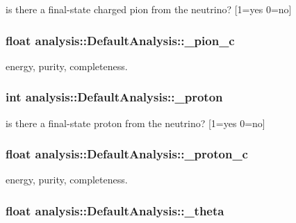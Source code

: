 is there a final-\/state charged pion from the neutrino? \mbox{[}1=yes 0=no\mbox{]} \hypertarget{classanalysis_1_1DefaultAnalysis_a9978effbcfba62536fc88a73fa985fe9}{
\subsubsection[{\-\_\-pion\-\_\-c}]{\setlength{\rightskip}{0pt plus 5cm}float analysis\-::\-Default\-Analysis\-::\-\_\-pion\-\_\-c\hspace{0.3cm}{\ttfamily [private]}}}\label{classanalysis_1_1DefaultAnalysis_a9978effbcfba62536fc88a73fa985fe9}
energy, purity, completeness. \hypertarget{classanalysis_1_1DefaultAnalysis_a8fd1f5d981dc5860f0c829c2b88a1363}{
\subsubsection[{\-\_\-proton}]{\setlength{\rightskip}{0pt plus 5cm}int analysis\-::\-Default\-Analysis\-::\-\_\-proton\hspace{0.3cm}{\ttfamily [private]}}}\label{classanalysis_1_1DefaultAnalysis_a8fd1f5d981dc5860f0c829c2b88a1363}
is there a final-\/state proton from the neutrino? \mbox{[}1=yes 0=no\mbox{]} \hypertarget{classanalysis_1_1DefaultAnalysis_a643cc086bdfa4332ced72f6d4e5ce233}{
\subsubsection[{\-\_\-proton\-\_\-c}]{\setlength{\rightskip}{0pt plus 5cm}float analysis\-::\-Default\-Analysis\-::\-\_\-proton\-\_\-c\hspace{0.3cm}{\ttfamily [private]}}}\label{classanalysis_1_1DefaultAnalysis_a643cc086bdfa4332ced72f6d4e5ce233}
energy, purity, completeness. \hypertarget{classanalysis_1_1DefaultAnalysis_adb169ccacccada1a17b6699a25f3fd67}{
\subsubsection[{\-\_\-theta}]{\setlength{\rightskip}{0pt plus 5cm}float analysis\-::\-Default\-Analysis\-::\-\_\-theta\hspace{0.3cm}{\ttfamily [private]}}}\label{classanalysis_1_1DefaultAnalysis_adb169ccacccada1a17b6699a25f3fd67}
